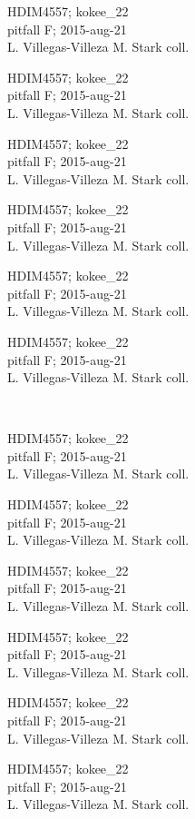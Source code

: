 \documentclass[2pt]{extarticle}
\begin{document}
\noindent
\parbox{0.16\textwidth}{\tiny \raggedright \rule[-0.3\baselineskip]{0pt}{10pt}HDIM4557; kokee\_22\\ pitfall F; 2015-aug-21\\ L. Villegas-Villeza M. Stark coll.}
\parbox{0.16\textwidth}{\tiny \raggedright \rule[-0.3\baselineskip]{0pt}{10pt}HDIM4557; kokee\_22\\ pitfall F; 2015-aug-21\\ L. Villegas-Villeza M. Stark coll.}
\parbox{0.16\textwidth}{\tiny \raggedright \rule[-0.3\baselineskip]{0pt}{10pt}HDIM4557; kokee\_22\\ pitfall F; 2015-aug-21\\ L. Villegas-Villeza M. Stark coll.}
\parbox{0.16\textwidth}{\tiny \raggedright \rule[-0.3\baselineskip]{0pt}{10pt}HDIM4557; kokee\_22\\ pitfall F; 2015-aug-21\\ L. Villegas-Villeza M. Stark coll.}
\parbox{0.16\textwidth}{\tiny \raggedright \rule[-0.3\baselineskip]{0pt}{10pt}HDIM4557; kokee\_22\\ pitfall F; 2015-aug-21\\ L. Villegas-Villeza M. Stark coll.}
\parbox{0.16\textwidth}{\tiny \raggedright \rule[-0.3\baselineskip]{0pt}{10pt}HDIM4557; kokee\_22\\ pitfall F; 2015-aug-21\\ L. Villegas-Villeza M. Stark coll.} \\ 
\vspace{0.001in} 

\noindent
\parbox{0.16\textwidth}{\tiny \raggedright \rule[-0.3\baselineskip]{0pt}{10pt}HDIM4557; kokee\_22\\ pitfall F; 2015-aug-21\\ L. Villegas-Villeza M. Stark coll.}
\parbox{0.16\textwidth}{\tiny \raggedright \rule[-0.3\baselineskip]{0pt}{10pt}HDIM4557; kokee\_22\\ pitfall F; 2015-aug-21\\ L. Villegas-Villeza M. Stark coll.}
\parbox{0.16\textwidth}{\tiny \raggedright \rule[-0.3\baselineskip]{0pt}{10pt}HDIM4557; kokee\_22\\ pitfall F; 2015-aug-21\\ L. Villegas-Villeza M. Stark coll.}
\parbox{0.16\textwidth}{\tiny \raggedright \rule[-0.3\baselineskip]{0pt}{10pt}HDIM4557; kokee\_22\\ pitfall F; 2015-aug-21\\ L. Villegas-Villeza M. Stark coll.}
\parbox{0.16\textwidth}{\tiny \raggedright \rule[-0.3\baselineskip]{0pt}{10pt}HDIM4557; kokee\_22\\ pitfall F; 2015-aug-21\\ L. Villegas-Villeza M. Stark coll.}
\parbox{0.16\textwidth}{\tiny \raggedright \rule[-0.3\baselineskip]{0pt}{10pt}HDIM4557; kokee\_22\\ pitfall F; 2015-aug-21\\ L. Villegas-Villeza M. Stark coll.} \\ 
\vspace{0.001in} 
\end{document}
